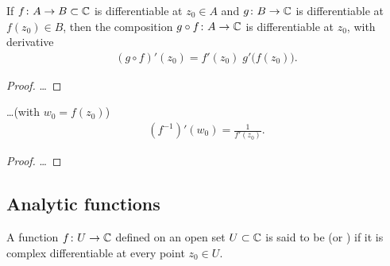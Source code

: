 \begin{lemma}
  \label{lem:chain_rule}
  If $f \colon A \to B \subset \mathbb{C}$ is differentiable at $z_0 \in A$
  and $g \colon B \to \mathbb{C}$ is differentiable at $f(z_0) \in B$,
  then the composition $g \circ f \colon A \to \mathbb{C}$ is differentiable at $z_0$,
  with derivative
  \begin{align*}
    (g \circ f)'(z_0) = f'(z_0) \; g'\big( f(z_0) \big) .
  \end{align*}
\end{lemma}
\begin{proof}
  \ldots
\end{proof}

\begin{lemma}
  \label{lem:inverse_derivative}
  \ldots (with $w_0 = f(z_0)$)
  \begin{align*}
    (f^{-1})'(w_0) = \frac{1}{f'(z_0)} .
  \end{align*}
\end{lemma}
\begin{proof}
  \ldots
\end{proof}


\subsection{Analytic functions}

\begin{definition}
  \label{def:analytic_function}
  A function $f \colon U \to \mathbb{C}$ defined on an open set $U \subset \mathbb{C}$ is
  said to be  (or ) if it is complex
  differentiable at every point $z_0 \in U$.
\end{definition}

